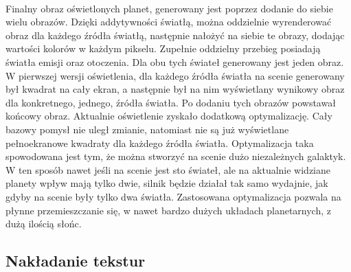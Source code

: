 \paragraph{}

Finalny obraz oświetlonych planet, generowany jest poprzez dodanie do siebie wielu obrazów. Dzięki addytywności światłą, można oddzielnie wyrenderować obraz dla każdego źródła światłą, następnie nałożyć na siebie te obrazy, dodając wartości kolorów w każdym pikselu. Zupełnie oddzielny przebieg posiadają światła emisji oraz otoczenia. Dla obu tych świateł generowany jest jeden obraz. W pierwszej wersji oświetlenia, dla każdego źródła światła na scenie generowany był kwadrat na cały ekran, a następnie był na nim wyświetlany wynikowy obraz dla konkretnego, jednego, źródła światła. Po dodaniu tych obrazów powstawał końcowy obraz. Aktualnie oświetlenie zyskało dodatkową optymalizację. Cały bazowy pomysł nie uległ zmianie, natomiast nie są już wyświetlane pełnoekranowe kwadraty dla każdego źródła światła. Optymalizacja taka spowodowana jest tym, że można stworzyć na scenie dużo niezależnych galaktyk. W ten sposób nawet jeśli na scenie jest sto świateł, ale na aktualnie widziane planety wpływ mają tylko dwie, silnik będzie działał tak samo wydajnie, jak gdyby na scenie były tylko dwa światła. Zastosowana optymalizacja pozwala na płynne przemieszczanie się, w nawet bardzo dużych układach planetarnych, z dużą ilością słońc.

\subsection{Nakładanie tekstur}\label{sub:nakladanie tekstur}
\paragraph{}

